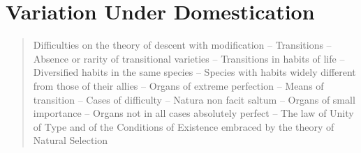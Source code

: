 \chapter{Variation Under Domestication}

\begin{quotation}
Difficulties on the theory of descent with modification -- Transitions -- Absence or rarity of transitional varieties -- Transitions in habits of life -- Diversified habits in the same species -- Species with habits widely different from those of their allies -- Organs of extreme perfection -- Means of transition -- Cases of difficulty -- Natura non facit saltum -- Organs of small importance -- Organs not in all cases absolutely perfect -- The law of Unity of Type and of the Conditions of Existence embraced by the theory of Natural Selection
\end{quotation}

